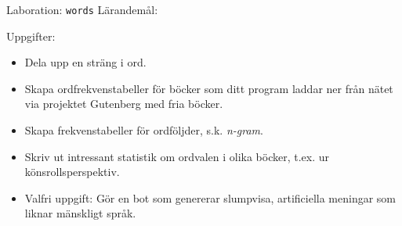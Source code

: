 \begin{Slide}{Laboration: \texttt{words}}
Lärandemål:
\begin{itemize}\SlideFontSmall

\end{itemize}
Uppgifter:
\begin{itemize}\SlideFontSmall
  \item Dela upp en sträng i ord.
  \item Skapa ordfrekvenstabeller för böcker som ditt program laddar ner från nätet via projektet Gutenberg med fria böcker.
  \item Skapa frekvenstabeller för ordföljder, s.k. \emph{n-gram}.
  \item Skriv ut intressant statistik om ordvalen i olika böcker, t.ex. ur könsrollsperspektiv.
  \item Valfri uppgift: Gör en bot som genererar slumpvisa, artificiella meningar som liknar mänskligt språk.
\end{itemize}
\end{Slide}



